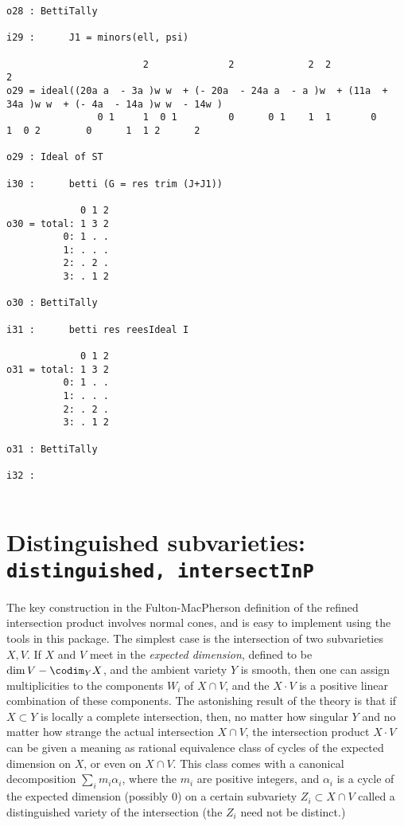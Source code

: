 \documentclass[twoside,12pt, leqno]{amsart}
\begin{document}
\begin{verbatim}
o28 : BettiTally

i29 :      J1 = minors(ell, psi)

                        2              2             2  2                                               2
o29 = ideal((20a a  - 3a )w w  + (- 20a  - 24a a  - a )w  + (11a  + 34a )w w  + (- 4a  - 14a )w w  - 14w )
                0 1     1  0 1         0      0 1    1  1       0      1  0 2        0      1  1 2      2

o29 : Ideal of ST

i30 :      betti (G = res trim (J+J1))

             0 1 2
o30 = total: 1 3 2
          0: 1 . .
          1: . . .
          2: . 2 .
          3: . 1 2

o30 : BettiTally

i31 :      betti res reesIdeal I

             0 1 2
o31 = total: 1 3 2
          0: 1 . .
          1: . . .
          2: . 2 .
          3: . 1 2

o31 : BettiTally

i32 : 
  
  \end{verbatim}
   
     

\section{Distinguished subvarieties: {\tt distinguished, intersectInP}}

The key construction in the Fulton-MacPherson definition of the refined intersection  product 
\cite[Section 6.1]{F}
involves normal cones, and is easy to implement using the tools in this package. The simplest case is the intersection of two subvarieties $X,V$. If $X$ and $V$ meet in the \emph{expected dimension}, defined to be $\dim V - \codim_{Y} X$,
and the ambient variety $Y$ is smooth, then one can assign multiplicities to the components $W_{i}$ of $X\cap V$, and the $X\cdot V$ is a positive linear
combination of these components. The astonishing result of the theory is that if $X\subset Y$ is locally a complete intersection, then, no matter how singular $Y$ and no matter how strange the actual intersection $X\cap V$, the intersection product 
$X\cdot V$ can be given a meaning as rational equivalence class of cycles of the expected dimension on $X$, or even on $X\cap V$. This class comes with a canonical decomposition $\sum_{i}m_{i}\alpha_{i}$, 
where the $m_{i}$ are positive integers, and $\alpha_{i}$ is a cycle of the expected dimension (possibly 0)
on a certain subvariety $Z_{i}\subset X\cap V$ called a distinguished variety of the intersection (the $Z_{i}$ need not be distinct.)
\end{document}
